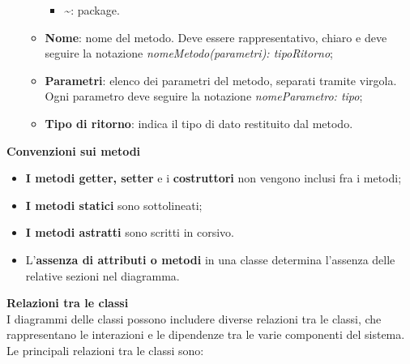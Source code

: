 \begin{enumerate}
\begin{itemize}
\begin{itemize}
			\item \textbf{\textasciitilde}: package.
		\end{itemize}
		\item \textbf{Nome}: nome del metodo. Deve essere rappresentativo, chiaro e deve seguire la notazione \textit{nomeMetodo(parametri): tipoRitorno};
		\item \textbf{Parametri}: elenco dei parametri del metodo, separati tramite virgola. Ogni parametro deve seguire la notazione \textit{nomeParametro: tipo};
		\item \textbf{Tipo di ritorno}: indica il tipo di dato restituito dal metodo.
	\end{itemize}
\end{enumerate}

\textbf{Convenzioni sui metodi}
\begin{itemize}
	\item \textbf{I metodi getter, setter} e i \textbf{costruttori} non vengono inclusi fra i metodi;
	\item \textbf{I metodi statici} sono sottolineati;
	\item \textbf{I metodi astratti} sono scritti in corsivo.
	\item L'\textbf{assenza di attributi o metodi} in una classe determina l'assenza delle relative sezioni nel diagramma.
\end{itemize}
\textbf{Relazioni tra le classi}\\
I diagrammi delle classi possono includere diverse relazioni tra le classi, che rappresentano le interazioni e le dipendenze tra le varie componenti del sistema. Le principali relazioni tra le classi sono:
